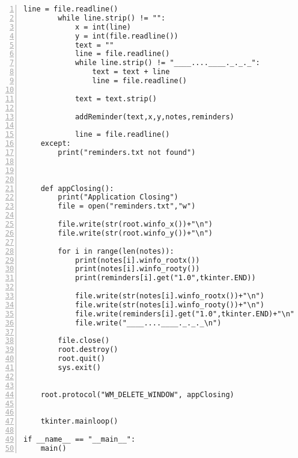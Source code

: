 \begin{lstlisting}[basicstyle=\ttfamily\scriptsize,numbers=left]
        line = file.readline()
        while line.strip() != "":
            x = int(line)
            y = int(file.readline())
            text = ""
            line = file.readline()
            while line.strip() != "____....____._._._":
                text = text + line
                line = file.readline()
                
            text = text.strip()
            
            addReminder(text,x,y,notes,reminders)
            
            line = file.readline()
    except:
        print("reminders.txt not found")
        
        
    
    def appClosing():
        print("Application Closing")
        file = open("reminders.txt","w")
        
        file.write(str(root.winfo_x())+"\n")
        file.write(str(root.winfo_y())+"\n")
        
        for i in range(len(notes)):
            print(notes[i].winfo_rootx())
            print(notes[i].winfo_rooty())
            print(reminders[i].get("1.0",tkinter.END))
            
            file.write(str(notes[i].winfo_rootx())+"\n")
            file.write(str(notes[i].winfo_rooty())+"\n")
            file.write(reminders[i].get("1.0",tkinter.END)+"\n")
            file.write("____....____._._._\n")
            
        file.close()
        root.destroy()
        root.quit()
        sys.exit()
        
    
    root.protocol("WM_DELETE_WINDOW", appClosing)  
    
         
    tkinter.mainloop()
    
if __name__ == "__main__":
    main()
\end{lstlisting}

\newpage
{}
\label{bouncingball}

